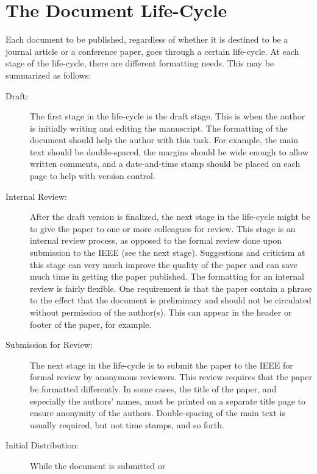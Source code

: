 \documentclass[%
	final,
	notitlepage,
	narroweqnarray,
	inline,
	twoside,
	]{ieee}
\begin{document}
\section{The Document Life-Cycle}

Each document to be published, regardless of whether it is destined to
be a journal article or a conference paper, goes through a certain
life-cycle. At each stage of the life-cycle, there are different
formatting needs. This may be summarized as follows:
\begin{description}
\item[Draft:] The first stage in the life-cycle is the draft stage.
    This is when the author is initially writing and editing the 
    manuscript. The formatting of the document should help the author 
    with this task. For example, the main text should be
    double-spaced, the margins should be wide enough to allow written
    comments, and a date-and-time stamp should be placed on each page to 
    help with version control.
\item[Internal Review:] After the draft version is finalized,
    the next stage in the life-cycle might be to give the paper
    to one or more colleagues for review. This stage is an internal review
    process, as opposed to the formal review done upon submission
    to the IEEE (see the next stage). Suggestions and 
    criticism at this stage can very much improve the quality of the 
    paper and can save much time in getting the paper 
    published. The formatting for an internal review is fairly flexible. 
    One requirement is that the paper contain a phrase to the effect that
    the document is preliminary and should not be circulated without
    permission of the author(s).  This can appear in the header or footer of
    the paper, for example.
\item[Submission for Review:] The next stage in the life-cycle is to 
    submit the paper to the IEEE for formal review by anonymous reviewers. 
    This review requires that the paper be formatted differently. In some 
    cases, the title of the paper, and especially the authors' names, 
    must be printed on a separate title page to ensure anonymity of the
    authors. Double-spacing of the main text is usually required, but not 
    time stamps, and so forth.
\item[Initial Distribution:] While the document is submitted or 

\end{description}
\end{document}
